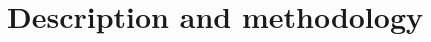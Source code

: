 \section{Description and methodology}

\begin{comment}
Vi burde kommentere litt om math.h, M\_2\_PI-moroa, samt problemer med
lydgenereringen. Også kommentere at sinus er alt for treg til å kunne
brukes direkte. 

Tidligere hadde vi problemer med å regne ut toner og lignende, og vi var
usikre på hvorfor vi fikk spraking o.l. Vi prøvde også å sette ned
raten, og det fungerte av ukjente grunner.  Det viser seg at en
kombinasjon av approksimasjoner av sinus samt mye multiplikasjon gjorde
interrupt-handleren tregere enn det vi trodde - og det å sette ned raten
gjorde det mulig interrupt-handleren å produsere lyden vi ønsket, men
med en dårligere kvalitet.

\end{comment}

